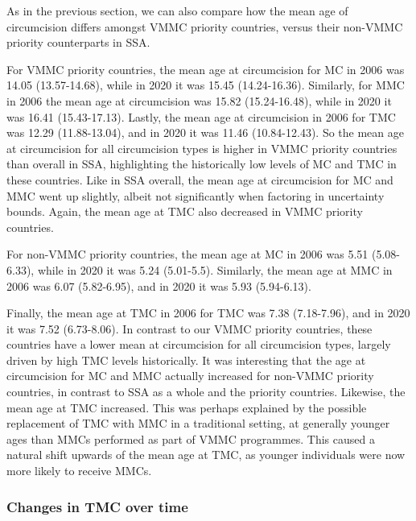 \documentclass{article}
\begin{document}
As in the previous section, we can also compare how the mean age of circumcision differs amongst VMMC priority countries, versus their non-VMMC priority counterparts in SSA.

For VMMC priority countries, the mean age at circumcision for MC in 2006 was 14.05 (13.57-14.68), while in 2020 it was 15.45 (14.24-16.36). Similarly, for MMC in 2006 the mean age at circumcision was 15.82 (15.24-16.48), while in 2020 it was 16.41 (15.43-17.13). Lastly, the mean age at circumcision in 2006 for TMC was 12.29 (11.88-13.04), and in 2020 it was 11.46 (10.84-12.43). So the mean age at circumcision for all circumcision types is higher in VMMC priority countries than overall in SSA, highlighting the historically low levels of MC and TMC in these countries. Like in SSA overall, the mean age at circumcision for MC and MMC went up slightly, albeit not significantly when factoring in uncertainty bounds. Again, the mean age at TMC also decreased in VMMC
priority countries.

For non-VMMC priority countries, the mean age at MC in 2006 was 5.51 (5.08-6.33), while in 2020 it was 5.24 (5.01-5.5). Similarly, the mean age at MMC in 2006 was 6.07 (5.82-6.95), and in 2020 it was 5.93 (5.94-6.13).

Finally, the mean age at TMC in 2006 for TMC was 7.38 (7.18-7.96), and in 2020 it was 7.52 (6.73-8.06). In contrast to our VMMC priority countries, these countries have a lower mean at circumcision for all circumcision types, largely driven by high TMC levels historically. It was interesting that the age at circumcision for MC and MMC actually increased for non-VMMC priority countries, in contrast to SSA as a whole and the priority countries. Likewise, the mean age at TMC increased. This was perhaps explained by the possible replacement of TMC with MMC in a traditional setting, at generally younger ages than MMCs performed as part of VMMC programmes. This caused a natural shift upwards of the mean age at TMC, as younger individuals were now more likely to receive MMCs.


\subsubsection*{Changes in TMC over time}

\end{document}
